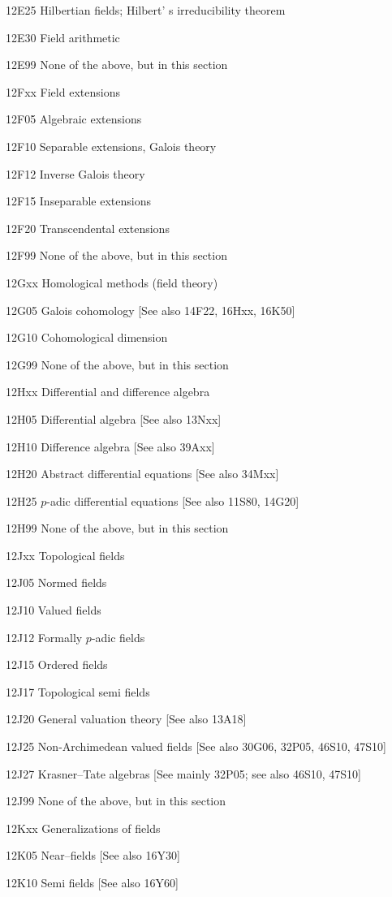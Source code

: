 \documentclass[12pt]{article}
\theoremstyle{plain}
\theoremstyle{definition}
\numberwithin{equation}{section}
\begin{document}
{12E25 Hilbertian fields; Hilbert' s irreducibility theorem

12E30 Field arithmetic

12E99 None of the above, but in this section

12Fxx Field extensions

12F05 Algebraic extensions

12F10 Separable extensions, Galois theory

12F12 Inverse Galois theory

12F15 Inseparable extensions

12F20 Transcendental extensions

12F99 None of the above, but in this section

12Gxx Homological methods (field theory)

12G05 Galois cohomology [See also 14F22, 16Hxx, 16K50]

12G10 Cohomological dimension

12G99 None of the above, but in this section

12Hxx Differential and difference algebra

12H05 Differential algebra [See also 13Nxx]

12H10 Difference algebra [See also 39Axx]

12H20 Abstract differential equations [See also 34Mxx]

12H25 $p$-adic differential equations [See also 11S80, 14G20]

12H99 None of the above, but in this section

12Jxx Topological fields

12J05 Normed fields

12J10 Valued fields

12J12 Formally $p$-adic fields

12J15 Ordered fields

12J17 Topological semi fields

12J20 General valuation theory [See also 13A18]

12J25 Non-Archimedean valued fields [See also 30G06, 32P05, 46S10, 47S10]

12J27 Krasner--Tate algebras [See mainly 32P05; see also 46S10, 47S10]

12J99 None of the above, but in this section

12Kxx Generalizations of fields

12K05 Near--fields [See also 16Y30]

12K10 Semi fields [See also 16Y60]

}
\end{document}
